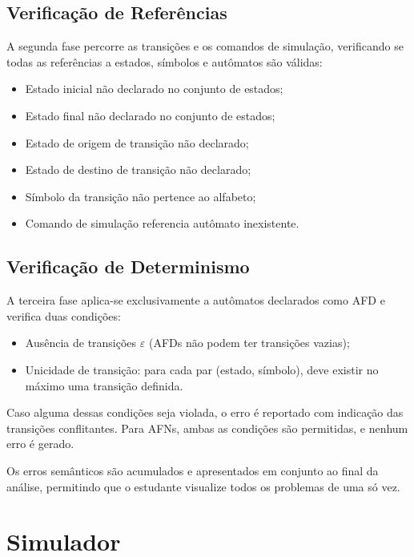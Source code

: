 \documentclass[
    12pt
    ,oneside
    ,a4paper
    ,chapter=TITLE
    ,section=TITLE
    ,sumario=abnt-6027-2012]{abntex2}
\begin{document}
\subsection{Verificação de Referências}
\label{sec:impl-referencias}

A segunda fase percorre as transições e os comandos de simulação, verificando se todas
as referências a estados, símbolos e autômatos são válidas:

\begin{itemize}
    \item Estado inicial não declarado no conjunto de estados;
    \item Estado final não declarado no conjunto de estados;
    \item Estado de origem de transição não declarado;
    \item Estado de destino de transição não declarado;
    \item Símbolo da transição não pertence ao alfabeto;
    \item Comando de simulação referencia autômato inexistente.
\end{itemize}

\subsection{Verificação de Determinismo}
\label{sec:impl-determinismo}

A terceira fase aplica-se exclusivamente a autômatos declarados como AFD e verifica
duas condições:

\begin{itemize}
    \item Ausência de transições $\varepsilon$ (AFDs não podem ter transições vazias);
    \item Unicidade de transição: para cada par (estado, símbolo), deve existir no
          máximo uma transição definida.
\end{itemize}

Caso alguma dessas condições seja violada, o erro é reportado com indicação das
transições conflitantes. Para AFNs, ambas as condições são permitidas, e nenhum erro
é gerado.

Os erros semânticos são acumulados e apresentados em conjunto ao final da análise,
permitindo que o estudante visualize todos os problemas de uma só vez.

\section{Simulador}
\label{sec:impl-simulador}
\end{document}
